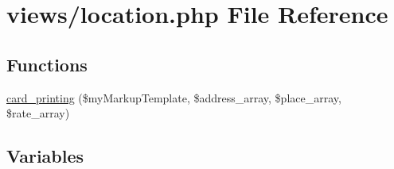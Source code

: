 \hypertarget{location_8php}{}\section{views/location.php File Reference}
\label{location_8php}
\subsection*{Functions}
\begin{DoxyCompactItemize}
\item 
\mbox{\hyperlink{location_8php_a94f49615449deadff259cd73979515b3}{card\+\_\+printing}} (\$my\+Markup\+Template, \$address\+\_\+array, \$place\+\_\+array, \$rate\+\_\+array)
\end{DoxyCompactItemize}
\subsection*{Variables}
